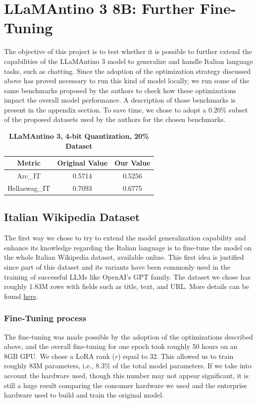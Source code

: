 \documentclass{article}
\begin{document}
	\section{LLaMAntino 3 8B: Further Fine-Tuning}
	The objective of this project is to test whether it is possible to further extend the capabilities of the LLaMAntino 3 model to generalize and handle Italian language tasks, such as chatting.
	Since the adoption of the optimization strategy discussed above has proved necessary to run this kind of model locally, we run some of the same benchmarks proposed by the authors to check how these optimizations impact the overall model performance. 
	A description of those benchmarks is present in the appendix section.  
	To save time, we chose to adopt a 0.20\% subset of the proposed datasets used by the authors for the chosen benchmarks.
	
	\begin{table}[h]
		\center
		\begin{tabular}{ccc}
			\toprule
			\textbf{Metric} & \textbf{Original Value} & \textbf{Our Value} \\
			\midrule
			Arc\_IT & 0.5714 & 0.5256 \\
			Hellaswag\_IT &	0.7093 & 0.6775 \\
			\bottomrule
		\end{tabular}
		\caption{\textbf{LLaMAntino 3, 4-bit Quantization, 20\% Dataset}}
	\end{table}
	
	\subsection{Italian Wikipedia Dataset}
	The first way we chose to try to extend the model generalization capability and enhance its knowledge regarding the Italian language is to fine-tune the model on the whole Italian Wikipedia dataset, available online.
	This first idea is justified since part of this dataset and its variants have been commonly used in the training of successful LLMs like OpenAI's GPT family. The dataset we chose has roughly 1.83M rows with fields such as title, text, and URL. More details can be found \href{https://huggingface.co/datasets/wikimedia/wikipedia/viewer/20231101.it}{here}.
	
	\subsubsection{Fine-Tuning process}
	The fine-tuning was made possible by the adoption of the optimizations described above, and the overall fine-tuning for one epoch took roughly 50 hours on an 8GB GPU.
	We chose a LoRA rank ($r$) equal to 32. This allowed us to train roughly 83M parameters, i.e., 8.3\% of the total model parameters.
	If we take into account the hardware used, though this number may not appear significant, it is still a huge result comparing the consumer hardware we used and the enterprise hardware used to build and train the original model.
		
\end{document}
